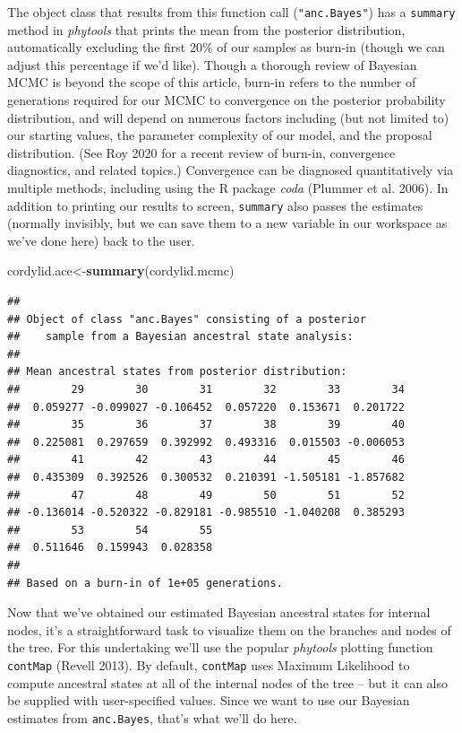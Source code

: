 \documentclass[fleqn,10pt,lineno]{wlpeerj} %
\newenvironment{Shaded}{\begin{snugshade}}{\end{snugshade}}
\newcommand{\FunctionTok}[1]{\textcolor[rgb]{0.13,0.29,0.53}{\textbf{#1}}}
\newcommand{\NormalTok}[1]{#1}
\newcommand{\OtherTok}[1]{\textcolor[rgb]{0.56,0.35,0.01}{#1}}
\begin{document}
The object class that results from this function call (\texttt{"anc.Bayes"}) has a \texttt{summary} method in \emph{phytools} that prints the mean from the posterior distribution, automatically excluding the first 20\% of our samples as burn-in (though we can adjust this percentage if we'd like). Though a thorough review of Bayesian MCMC is beyond the scope of this article, burn-in refers to the number of generations required for our MCMC to convergence on the posterior probability distribution, and will depend on numerous factors including (but not limited to) our starting values, the parameter complexity of our model, and the proposal distribution. (See Roy 2020 for a recent review of burn-in, convergence diagnostics, and related topics.) Convergence can be diagnosed quantitatively via multiple methods, including using the R package \emph{coda} (Plummer et al. 2006). In addition to printing our results to screen, \texttt{summary} also passes the estimates (normally invisibly, but we can save them to a new variable in our workspace as we've done here) back to the user.

\begin{Shaded}
\begin{Highlighting}[]
\NormalTok{cordylid.ace}\OtherTok{\textless{}{-}}\FunctionTok{summary}\NormalTok{(cordylid.mcmc)}
\end{Highlighting}
\end{Shaded}

\begin{verbatim}
## 
## Object of class "anc.Bayes" consisting of a posterior
##    sample from a Bayesian ancestral state analysis:
## 
## Mean ancestral states from posterior distribution:
##        29        30        31        32        33        34 
##  0.059277 -0.099027 -0.106452  0.057220  0.153671  0.201722 
##        35        36        37        38        39        40 
##  0.225081  0.297659  0.392992  0.493316  0.015503 -0.006053 
##        41        42        43        44        45        46 
##  0.435309  0.392526  0.300532  0.210391 -1.505181 -1.857682
##        47        48        49        50        51        52
## -0.136014 -0.520322 -0.829181 -0.985510 -1.040208  0.385293
##        53        54        55 
##  0.511646  0.159943  0.028358 
## 
## Based on a burn-in of 1e+05 generations.
\end{verbatim}

Now that we've obtained our estimated Bayesian ancestral states for internal nodes, it's a straightforward task to visualize them on the branches and nodes of the tree. For this undertaking we'll use the popular \emph{phytools} plotting function \texttt{contMap} (Revell 2013). By default, \texttt{contMap} uses Maximum Likelihood to compute ancestral states at all of the internal nodes of the tree -- but it can also be supplied with user-specified values. Since we want to use our Bayesian estimates from \texttt{anc.Bayes}, that's what we'll do here.
\end{document}
